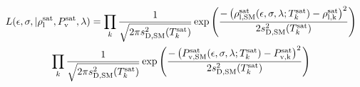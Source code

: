 \documentclass[preprint,letterpaper,floatfix,citeautoscript,aip,jcp]{revtex4-1}
\begin{document}
\begin{multline} \label{eq:Likelihood normal distribution}
L(\epsilon,\sigma,|\rho_{\rm l}^{\rm sat},P_{\rm v}^{\rm sat},\lambda) = \prod_{k} \frac{1}{\sqrt{2 \pi s^2_{\rm D,SM}(T_k^{\rm sat})}} \exp\left(\frac{-\left(\rho_{\rm l,SM}^{\rm sat}(\epsilon,\sigma,\lambda;T_k^{\rm sat}) -\rho_{\rm{l},k}^{\rm sat} \right)^2}{2 s^2_{\rm D,SM}(T_k^{\rm sat})}\right) \\ \prod_{k} \frac{1}{\sqrt{2 \pi s^2_{\rm D,SM}(T_k^{\rm sat})}} \exp\left(\frac{-\left(P_{\rm v,SM}^{\rm sat}(\epsilon,\sigma,\lambda;T_k^{\rm sat}) -P_{\rm v,k}^{\rm sat} \right)^2}{2 s^2_{\rm D,SM}(T_k^{\rm sat})}\right)
\end{multline}
\end{document}
